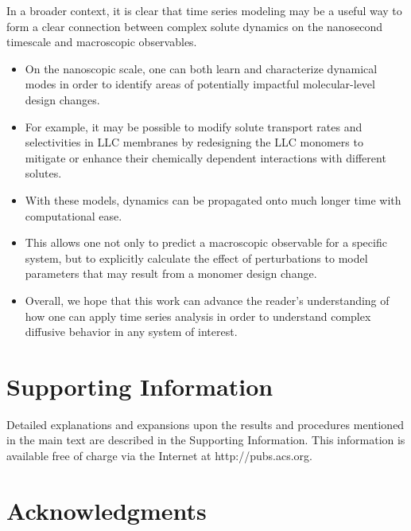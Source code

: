 \documentclass[journal=jctcce,manuscript=article]{achemso}
\begin{document}
  In a broader context, it is clear that time series modeling may be a useful way
  to form a clear connection between complex solute dynamics on the nanosecond 
  timescale and macroscopic observables.
  \begin{itemize}
    \item On the nanoscopic scale, one can both learn and characterize dynamical
    modes in order to identify areas of potentially impactful molecular-level design
    changes. 
    \item For example, it may be possible to modify solute transport rates and 
    selectivities in LLC membranes by redesigning the LLC monomers to mitigate or 
    enhance their chemically dependent interactions with different solutes.
    \item With these models, dynamics can be propagated onto much longer time 
    with computational ease.
    \item This allows one not only to predict a macroscopic observable for a specific
    system, but to explicitly calculate the effect of perturbations to model parameters
    that may result from a monomer design change.
    \item Overall, we hope that this work can advance the reader's understanding of
    how one can apply time series analysis in order to understand complex diffusive 
    behavior in any system of interest.
  \end{itemize}
  
  \section*{Supporting Information}

  Detailed explanations and expansions upon the results and procedures
  mentioned in the main text are described in the Supporting Information. This
  information is available free of charge via the Internet at
  http://pubs.acs.org.

  \section*{Acknowledgments}
  
\end{document}
